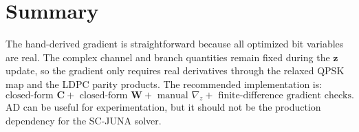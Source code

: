 \documentclass[11pt]{article}
\begin{document}
\section{Summary}

The hand-derived gradient is straightforward because all optimized bit variables are real.  The complex channel and branch quantities remain fixed during the $\bm z$ update, so the gradient only requires real derivatives through the relaxed QPSK map and the LDPC parity products.  The recommended implementation is:
\begin{equation}
\boxed{
\text{closed-form }\mathbf C
+\text{ closed-form }\mathbf W
+\text{ manual }\nabla_z
+\text{ finite-difference gradient checks}.}
\end{equation}
AD can be useful for experimentation, but it should not be the production dependency for the SC-JUNA solver.
\end{document}
